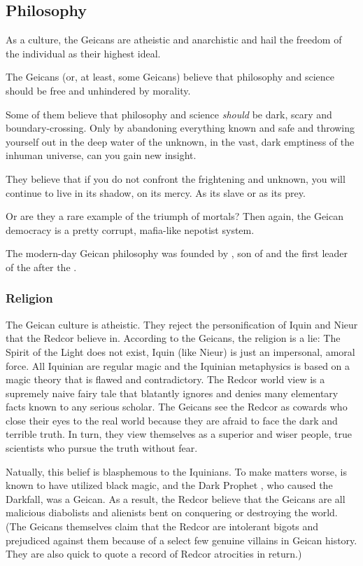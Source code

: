 \subsection{Philosophy}
As a culture, the Geicans are atheistic and anarchistic and hail the freedom of the individual as their highest ideal. 

The Geicans (or, at least, some Geicans) believe that philosophy and science should be free and unhindered by morality. 

Some of them believe that philosophy and science \emph{should} be dark, scary and boundary-crossing. Only by abandoning everything known and safe and throwing yourself out in the deep water of the unknown, in the vast, dark emptiness of the inhuman universe, can you gain new insight. 

They believe that if you do not confront the frightening and unknown, you will continue to live in its shadow, on its mercy. As its slave or as its prey. 

Or are they a rare example of the triumph of mortals? Then again, the Geican democracy is a pretty corrupt, mafia-like nepotist system.

The modern-day Geican philosophy was founded by , son of  \Belzir{} and the first leader of the \vclan after the \Darkfall. 





\subsubsection{Religion}
The Geican culture is atheistic. They reject the personification of Iquin and Nieur that the Redcor believe in. According to the Geicans, the  religion is a lie: The Spirit of the Light does not exist, Iquin (like Nieur) is just an impersonal, amoral force. All Iquinian  are regular magic and the Iquinian metaphysics is based on a magic theory that is flawed and contradictory. The Redcor world view is a supremely naive fairy tale that blatantly ignores and denies many elementary facts known to any serious scholar. The Geicans see the Redcor as cowards who close their eyes to the real world because they are afraid to face the dark and terrible truth. In turn, they view themselves as a superior and wiser people, true scientists who pursue the truth without fear. 

Natually, this belief is blasphemous to the Iquinians. To make matters worse, \ClanGeican is known to have utilized black magic, and the Dark Prophet \Belzir{}, who caused the Darkfall, was a Geican. As a result, the Redcor believe that the Geicans are all malicious diabolists and alienists bent on conquering or destroying the world. (The Geicans themselves claim that the Redcor are intolerant bigots and prejudiced against them because of a select few genuine villains in Geican history. They are also quick to quote a record of Redcor atrocities in return.) 





